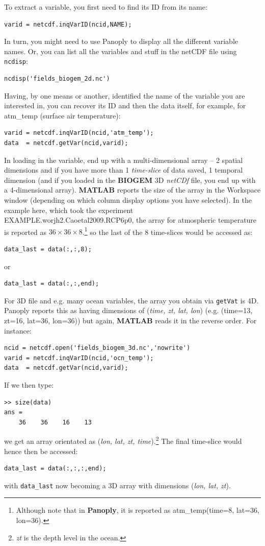\documentclass[11pt,fleqn]{book} %
\begin{document}
To extract a variable, you first need to find its ID from its name:

\begin{verbatim}
varid = netcdf.inqVarID(ncid,NAME);
\end{verbatim}

In turn, you might need to use Panoply to display all the different variable names. Or, you can list all the variables and stuff in the netCDF file using \texttt{ncdisp}:
\begin{verbatim}
ncdisp('fields_biogem_2d.nc') 
\end{verbatim}

Having, by one means or another, identified the name of the variable you are interested in, you can recover its ID and then the data itself, for example, for \textsf{\footnotesize atm\_temp} (\textsf{\footnotesize surface air temperature}):
\begin{verbatim}
varid = netcdf.inqVarID(ncid,'atm_temp');
data  = netcdf.getVar(ncid,varid);
\end{verbatim}

In loading in the variable, end up with a multi-dimensional array -- 2 spatial dimensions and if you have more than 1 \textit{time-slice} of data saved, 1 temporal dimension (and if you loaded in the \textbf{BIOGEM} 3D \textit{netCDf} file, you end up with a 4-dimensional array). \textbf{MATLAB} reports the size of the array in the \textsf{\footnotesize Workspace window} (depending on which column display options you have selected). In the example here, which took the experiment \textsf{\footnotesize EXAMPLE.worjh2.Caoetal2009.RCP6p0}, the array for atmospheric temperature is reported as \(36\times36\times8\).\footnote{Although note that in \textbf{Panoply}, it is reported as \textsf{\scriptsize atm\_temp(time=8, lat=36, lon=36)}.} so the last of the 8 time-slices would  be accessed as:
\begin{verbatim}
data_last = data(:,:,8);
\end{verbatim}
or
\begin{verbatim}
data_last = data(:,:,end);
\end{verbatim}

For 3D file and e.g. many ocean variables, the array you obtain via \texttt{getVat} is 4D. Panoply reports this as having dimensions of (\textit{time, zt, lat, lon}) (e.g. (time=13, zt=16, lat=36, lon=36)) but again, \textbf{MATLAB} reads it in the reverse order. For instance:
\begin{verbatim}
ncid = netcdf.open('fields_biogem_3d.nc','nowrite')
varid = netcdf.inqVarID(ncid,'ocn_temp');
data  = netcdf.getVar(ncid,varid);
\end{verbatim}
If we then type:
\begin{verbatim}
>> size(data)
ans =
    36    36    16    13
\end{verbatim}
we get an array orientated as (\textit{lon, lat, zt, time}).\footnote{\textit{zt} is the depth level in the ocean.} The final time-slice would hence then be accessed:
\begin{verbatim}
data_last = data(:,:,:,end);
\end{verbatim}
with \texttt{data\_last} now becoming a 3D array with dimensions (\textit{lon, lat, zt}).
\end{document}
